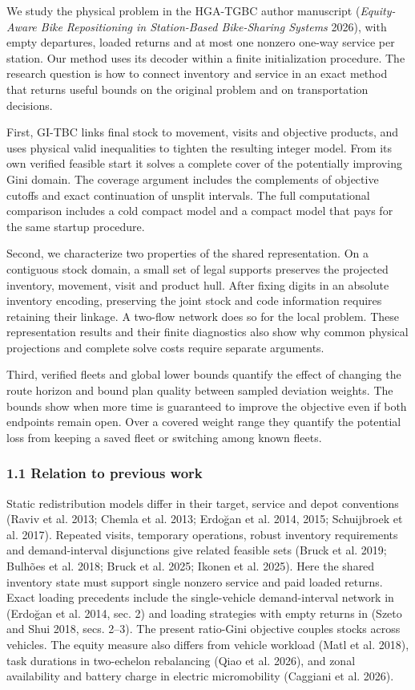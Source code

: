 \documentclass[
  american,
  11pt,
]{article}
\begin{document}
We study the physical problem in the HGA-TGBC author manuscript
(\emph{Equity-Aware Bike Repositioning in Station-Based Bike-Sharing
Systems} 2026), with empty departures, loaded returns and at most one
nonzero one-way service per station. Our method uses its decoder within
a finite initialization procedure. The research question is how to
connect inventory and service in an exact method that returns useful
bounds on the original problem and on transportation decisions.

First, GI-TBC links final stock to movement, visits and objective
products, and uses physical valid inequalities to tighten the resulting
integer model. From its own verified feasible start it solves a complete
cover of the potentially improving Gini domain. The coverage argument
includes the complements of objective cutoffs and exact continuation of
unsplit intervals. The full computational comparison includes a cold
compact model and a compact model that pays for the same startup
procedure.

Second, we characterize two properties of the shared representation. On
a contiguous stock domain, a small set of legal supports preserves the
projected inventory, movement, visit and product hull. After fixing
digits in an absolute inventory encoding, preserving the joint stock and
code information requires retaining their linkage. A two-flow network
does so for the local problem. These representation results and their
finite diagnostics also show why common physical projections and
complete solve costs require separate arguments.

Third, verified fleets and global lower bounds quantify the effect of
changing the route horizon and bound plan quality between sampled
deviation weights. The bounds show when more time is guaranteed to
improve the objective even if both endpoints remain open. Over a covered
weight range they quantify the potential loss from keeping a saved fleet
or switching among known fleets.

\subsubsection{1.1 Relation to previous
work}\label{relation-to-previous-work}

Static redistribution models differ in their target, service and depot
conventions (Raviv et al. 2013; Chemla et al. 2013; Erdoğan et al. 2014,
2015; Schuijbroek et al. 2017). Repeated visits, temporary operations,
robust inventory requirements and demand-interval disjunctions give
related feasible sets (Bruck et al. 2019; Bulhões et al. 2018; Bruck et
al. 2025; Ikonen et al. 2025). Here the shared inventory state must
support single nonzero service and paid loaded returns. Exact loading
precedents include the single-vehicle demand-interval network in
(Erdoğan et al. 2014, sec. 2) and loading strategies with empty returns
in (Szeto and Shui 2018, secs. 2--3). The present ratio-Gini objective
couples stocks across vehicles. The equity measure also differs from
vehicle workload (Matl et al. 2018), task durations in two-echelon
rebalancing (Qiao et al. 2026), and zonal availability and battery
charge in electric micromobility (Caggiani et al. 2026).
\end{document}
